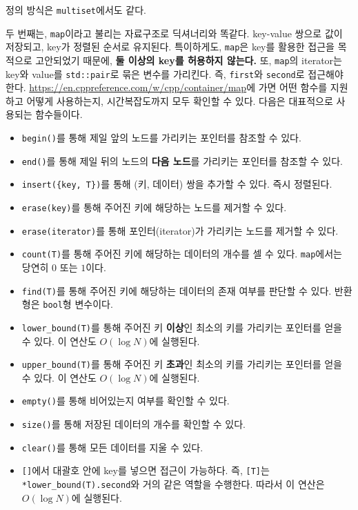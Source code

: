 정의 방식은 \texttt{multiset}에서도 같다.

두 번째는, \texttt{map}이라고 불리는 자료구조로 딕셔너리와 똑같다. key-value 쌍으로 값이 저장되고, key가 정렬된 순서로 유지된다. 특이하게도, \texttt{map}은 key를 활용한 접근을 목적으로 고안되었기 때문에, \textbf{둘 이상의 key를 허용하지 않는다.} 또, \texttt{map}의 iterator는 key와 value를 \texttt{std::pair}로 묶은 변수를 가리킨다. 즉, \texttt{first}와 \texttt{second}로 접근해야 한다. \url{https://en.cppreference.com/w/cpp/container/map}에 가면 어떤 함수를 지원하고 어떻게 사용하는지, 시간복잡도까지 모두 확인할 수 있다. 다음은 대표적으로 사용되는 함수들이다.

\begin{itemize}
    \item \texttt{begin()}를 통해 제일 앞의 노드를 가리키는 포인터를 참조할 수 있다.
    \item \texttt{end()}를 통해 제일 뒤의 노드의 \textbf{다음 노드}를 가리키는 포인터를 참조할 수 있다.
    \item \texttt{insert(\{key, T\})}를 통해 (키, 데이터) 쌍을 추가할 수 있다. 즉시 정렬된다.
    \item \texttt{erase(key)}를 통해 주어진 키에 해당하는 노드를 제거할 수 있다.
    \item \texttt{erase(iterator)}를 통해 포인터(iterator)가 가리키는 노드를 제거할 수 있다.
    \item \texttt{count(T)}를 통해 주어진 키에 해당하는 데이터의 개수를 셀 수 있다. \texttt{map}에서는 당연히 $0$ 또는 $1$이다.
    \item \texttt{find(T)}를 통해 주어진 키에 해당하는 데이터의 존재 여부를 판단할 수 있다. 반환형은 \texttt{bool}형 변수이다.
    \item \texttt{lower\_bound(T)}를 통해 주어진 키 \textbf{이상}인 최소의 키를 가리키는 포인터를 얻을 수 있다. 이 연산도 $O(\log N)$에 실행된다.
    \item \texttt{upper\_bound(T)}를 통해 주어진 키 \textbf{초과}인 최소의 키를 가리키는 포인터를 얻을 수 있다. 이 연산도 $O(\log N)$에 실행된다.
    \item \texttt{empty()}를 통해 비어있는지 여부를 확인할 수 있다.
    \item \texttt{size()}를 통해 저장된 데이터의 개수를 확인할 수 있다.
    \item \texttt{clear()}를 통해 모든 데이터를 지울 수 있다.
    \item \texttt{[]}에서 대괄호 안에 key를 넣으면 접근이 가능하다. 즉, \texttt{[T]}는 \texttt{*lower\_bound(T).second}와 거의 같은 역할을 수행한다. 따라서 이 연산은 $O(\log N)$에 실행된다.
\end{itemize}

